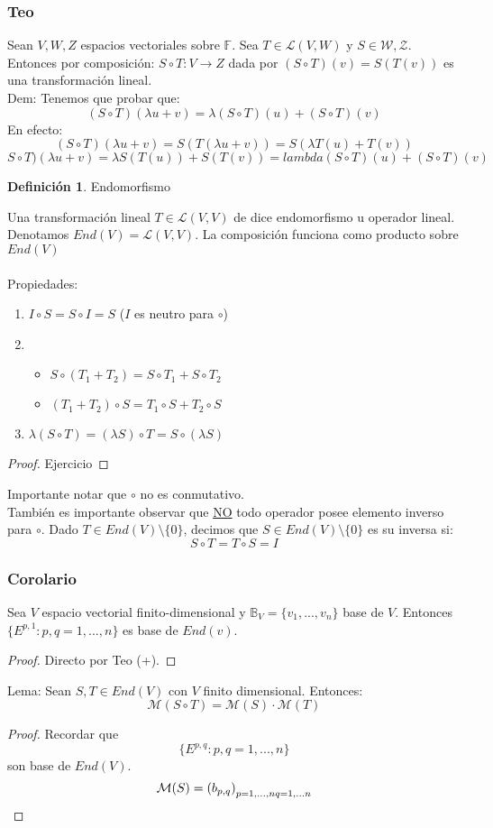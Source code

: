 \documentclass[11pt]{book}
\theoremstyle{definition}
\newtheorem{defn}{Definición}[section]
\begin{document}
\subsubsection{Teo}
Sean $V,W,Z$ espacios vectoriales sobre $\mathbb{F}$. Sea $T\in\mathcal{L}(V,W)$ y $S\in\mathcal{W,Z}$. Entonces por composición: $S\circ T:V\rightarrow Z$ dada por $(S\circ T)(v)=S(T(v))$ es una transformación lineal.\\
Dem: Tenemos que probar que:
\[
(S\circ T)(\lambda u+v)=\lambda(S\circ T)(u)+(S\circ T)(v)
\]
En efecto:
\[
(S\circ T)(\lambda u+v)=S(T(\lambda u+v))=S(\lambda T(u)+T(v))
\]
\[
S\circ T)(\lambda u+v)=\lambda S(T(u))+S(T(v))=lambda(S\circ T)(u)+(S\circ T)(v)
\]
\begin{defn}{Endomorfismo}

Una transformación lineal $T\in\mathcal{L}(V,V)$ de dice endomorfismo u operador lineal. Denotamos $End (V)=\mathcal{L}(V,V)$. La composición funciona como producto sobre $End(V)$\\\\
Propiedades:
\begin{enumerate}[label=\alph*)]
	\item $I\circ S=S\circ I=S$ ($I$ es neutro para $\circ$)
	
	\item \begin{itemize} \item $S\circ (T_1+T_2)=S\circ T_1+S\circ T_2$
					\item $(T_1+T_2)\circ S=T_1\circ S+T_2\circ S$
		\end{itemize}
	
	\item $\lambda(S\circ T)=(\lambda S)\circ T=S\circ(\lambda S)$
\end{enumerate}
\end{defn}
\begin{proof}
Ejercicio
\end{proof}
Importante notar que $\circ$ no es conmutativo.\\
También es importante observar que \underline{NO} todo operador posee elemento inverso para $\circ$. Dado $T\in End(V)\setminus\{0\}$, decimos que $S\in End(V)\setminus\{0\}$ es su inversa si:
\[
S\circ T=T\circ S=I
\]
\subsubsection{Corolario}
Sea $V$ espacio vectorial finito-dimensional y $\mathbb{B}_V=\{v_1,...,v_n\}$ base de $V$. Entonces $\{E^{p,1}:p,q=1,...,n\}$ es base de $End(v)$.\\
\begin{proof}
Directo por Teo (+).
\end{proof}
Lema: Sean $S,T\in End(V)$ con $V$ finito dimensional. Entonces:
\[
\mathcal{M}(S\circ T)=\mathcal{M}(S)\cdot\mathcal{M}(T)
\]
\begin{proof}
Recordar que
\[\{E^{p,q}:p,q=1,...,n\}\]
son base de $End(V)$.
\[\mathcal{M}(S)=\left(b_{p,q}\right)_{p=1,...,n\\q=1,...n}\]
\end{proof}
\end{document}
